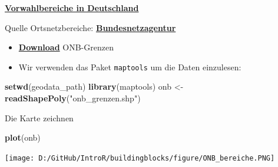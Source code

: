 \documentclass[ignorenonframetext,]{beamer}
\newenvironment{Shaded}{\begin{snugshade}}{\end{snugshade}}
\newcommand{\KeywordTok}[1]{\textcolor[rgb]{0.26,0.66,0.93}{\textbf{#1}}}
\newcommand{\NormalTok}[1]{\textcolor[rgb]{0.74,0.68,0.62}{#1}}
\newcommand{\StringTok}[1]{\textcolor[rgb]{0.02,0.61,0.04}{#1}}
\begin{document}
\begin{frame}[fragile]{\href{http://www.bundesnetzagentur.de/SharedDocs/Downloads/DE/Sachgebiete/Telekommunikation/Unternehmen_Institutionen/Nummerierung/Rufnummern/ONVerzeichnisse/ONBGrenzen/ONB_Grenzen.html}{\textbf{Vorwahlbereiche
in Deutschland}}}
\protect\hypertarget{vorwahlbereiche-in-deutschland}{}

\begin{block}{Quelle Ortsnetzbereiche:
\href{https://www.bundesnetzagentur.de/DE/Sachgebiete/Telekommunikation/Unternehmen_Institutionen/Nummerierung/Rufnummern/ONRufnr/ON_Einteilung_ONB/ON_ONB_ONKz_ONBGrenzen_Basepage.html}{\textbf{Bundesnetzagentur}}}

\begin{itemize}
\item
  \href{https://www.bundesnetzagentur.de/SharedDocs/Downloads/DE/Sachgebiete/Telekommunikation/Unternehmen_Institutionen/Nummerierung/Rufnummern/ONVerzeichnisse/ONBGrenzen/ONB-Grenzen-2018.zip?__blob=publicationFile\&v=21}{\textbf{Download}}
  ONB-Grenzen
\item
  Wir verwenden das Paket \texttt{maptools} um die Daten einzulesen:
\end{itemize}

\begin{Shaded}
\begin{Highlighting}[]
\KeywordTok{setwd}\NormalTok{(geodata_path)}
\KeywordTok{library}\NormalTok{(maptools)}
\NormalTok{onb <-}\StringTok{ }\KeywordTok{readShapePoly}\NormalTok{(}\StringTok{"onb_grenzen.shp"}\NormalTok{)}
\end{Highlighting}
\end{Shaded}

\end{block}

\end{frame}

\begin{frame}[fragile]{Die Karte zeichnen}
\protect\hypertarget{die-karte-zeichnen}{}

\begin{Shaded}
\begin{Highlighting}[]
\KeywordTok{plot}\NormalTok{(onb)}
\end{Highlighting}
\end{Shaded}

\texttt{[image: D:/GitHub/IntroR/buildingblocks/figure/ONB\_bereiche.PNG]}

\end{frame}
\end{document}
